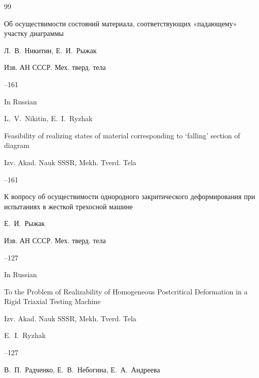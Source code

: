 \begin{thebibliography}{99}







\paper Об осуществимости состояний материала, соответствующих «падающему» участку диаграммы

\by Л.~В.~Никитин, Е.~И.~Рыжак

\jour Изв. АН СССР. Мех. тверд. тела



--161

\misctransl

\lang In Russian

\by L.~V.~Nikitin, E.~I.~Ryzhak

\paper Feasibility of realizing states of material corresponding to `falling' section of diagram

\jour Izv. Akad. Nauk SSSR, Mekh. Tverd. Tela


–161 







\paper К вопросу об осуществимости однородного закритического деформирования при испытаниях в жесткой трехосной машине

\by Е.~И.~Рыжак

\jour Изв. АН СССР. Мех. тверд. тела



--127

\misctransl

\lang In Russian

\paper To the Problem of Realizability of Homogeneous Postcritical Deformation in a Rigid Triaxial Testing Machine

\jour Izv. Akad. Nauk SSSR, Mekh. Tverd. Tela

\by E.~I.~Ryzhak



--127






\by В.~П.~Радченко, Е.~В.~Небогина, Е.~А.~Андреева


\end{thebibliography}
